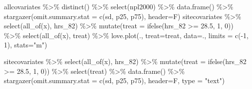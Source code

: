 \documentclass[
]{article}
\newenvironment{Shaded}{\begin{snugshade}}{\end{snugshade}}
\newcommand{\AttributeTok}[1]{\textcolor[rgb]{0.77,0.63,0.00}{#1}}
\newcommand{\DecValTok}[1]{\textcolor[rgb]{0.00,0.00,0.81}{#1}}
\newcommand{\FloatTok}[1]{\textcolor[rgb]{0.00,0.00,0.81}{#1}}
\newcommand{\FunctionTok}[1]{\textcolor[rgb]{0.00,0.00,0.00}{#1}}
\newcommand{\NormalTok}[1]{#1}
\newcommand{\SpecialCharTok}[1]{\textcolor[rgb]{0.00,0.00,0.00}{#1}}
\newcommand{\StringTok}[1]{\textcolor[rgb]{0.31,0.60,0.02}{#1}}
\begin{document}
\begin{Shaded}
\begin{Highlighting}[]
\NormalTok{allcovariates }\SpecialCharTok{\%\textgreater{}\%}
    \FunctionTok{distinct}\NormalTok{() }\SpecialCharTok{\%\textgreater{}\%}
    \FunctionTok{select}\NormalTok{(npl2000) }\SpecialCharTok{\%\textgreater{}\%}
    \FunctionTok{data.frame}\NormalTok{() }\SpecialCharTok{\%\textgreater{}\%}
    \FunctionTok{stargazer}\NormalTok{(}\AttributeTok{omit.summary.stat =} \FunctionTok{c}\NormalTok{(}\StringTok{\textquotesingle{}sd\textquotesingle{}}\NormalTok{, }\StringTok{\textquotesingle{}p25\textquotesingle{}}\NormalTok{, }\StringTok{\textquotesingle{}p75\textquotesingle{}}\NormalTok{), }\AttributeTok{header=}\NormalTok{F)}
\NormalTok{sitecovariates }\SpecialCharTok{\%\textgreater{}\%}
    \FunctionTok{select}\NormalTok{(}\FunctionTok{all\_of}\NormalTok{(x), hrs\_82) }\SpecialCharTok{\%\textgreater{}\%}
    \FunctionTok{mutate}\NormalTok{(}\AttributeTok{treat =} \FunctionTok{ifelse}\NormalTok{(hrs\_82 }\SpecialCharTok{\textgreater{}=} \FloatTok{28.5}\NormalTok{, }\DecValTok{1}\NormalTok{, }\DecValTok{0}\NormalTok{)) }\SpecialCharTok{\%\textgreater{}\%}
    \FunctionTok{select}\NormalTok{(}\FunctionTok{all\_of}\NormalTok{(x), treat) }\SpecialCharTok{\%\textgreater{}\%}
    \FunctionTok{love.plot}\NormalTok{(., }\AttributeTok{treat=}\StringTok{\textquotesingle{}treat\textquotesingle{}}\NormalTok{, }\AttributeTok{data=}\NormalTok{., }\AttributeTok{limits =} \FunctionTok{c}\NormalTok{(}\SpecialCharTok{{-}}\DecValTok{1}\NormalTok{, }\DecValTok{1}\NormalTok{),}
            \AttributeTok{stats=}\StringTok{"m"}\NormalTok{)}

\NormalTok{sitecovariates }\SpecialCharTok{\%\textgreater{}\%}
    \FunctionTok{select}\NormalTok{(}\FunctionTok{all\_of}\NormalTok{(x), hrs\_82) }\SpecialCharTok{\%\textgreater{}\%}
    \FunctionTok{mutate}\NormalTok{(}\AttributeTok{treat =} \FunctionTok{ifelse}\NormalTok{(hrs\_82 }\SpecialCharTok{\textgreater{}=} \FloatTok{28.5}\NormalTok{, }\DecValTok{1}\NormalTok{, }\DecValTok{0}\NormalTok{)) }\SpecialCharTok{\%\textgreater{}\%}
    \FunctionTok{select}\NormalTok{(treat) }\SpecialCharTok{\%\textgreater{}\%}
    \FunctionTok{data.frame}\NormalTok{() }\SpecialCharTok{\%\textgreater{}\%}
    \FunctionTok{stargazer}\NormalTok{(}\AttributeTok{omit.summary.stat =} \FunctionTok{c}\NormalTok{(}\StringTok{\textquotesingle{}sd\textquotesingle{}}\NormalTok{, }\StringTok{\textquotesingle{}p25\textquotesingle{}}\NormalTok{, }\StringTok{\textquotesingle{}p75\textquotesingle{}}\NormalTok{), }\AttributeTok{header=}\NormalTok{F, }\AttributeTok{type =} \StringTok{"text"}\NormalTok{)}


\end{Highlighting}
\end{Shaded}
\end{document}
